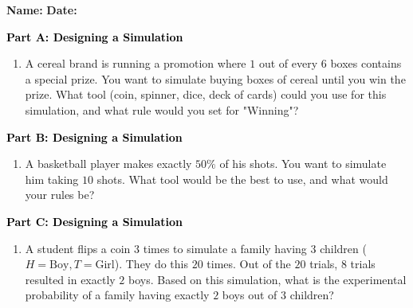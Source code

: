 \documentclass[12pt, letterpaper, fleqn]{article}
\begin{document}
\textbf{Name:} \underline{\hspace{5cm}}
\hfill
\textbf{Date:} \underline{\hspace{3cm}}\\

\begin{tcolorbox}[colback=customteal!20]
\large\textcolor{black}{\textbf{Part A: Designing a Simulation}}
\end{tcolorbox}

\vspace{3mm}

\begin{enumerate}[itemsep=4.2cm, leftmargin=0.6cm]
\item A cereal brand is running a promotion where $1$ out of every $6$ boxes contains a special prize. You want to simulate buying boxes of cereal until you win the prize. What tool (coin, spinner, dice, deck of cards) could you use for this simulation, and what rule would you set for "Winning"?
\end{enumerate}

\newpage

\begin{tcolorbox}[colback=customteal!20]
\large\textcolor{black}{\textbf{Part B: Designing a Simulation}}
\end{tcolorbox}

\vspace{3mm}

\begin{enumerate}[itemsep=4.2cm, leftmargin=0.6cm, resume]
\item A basketball player makes exactly $50\%$ of his shots. You want to simulate him taking $10$ shots. What tool would be the best to use, and what would your rules be?
\end{enumerate}

\newpage

\begin{tcolorbox}[colback=customteal!20]
\large\textcolor{black}{\textbf{Part C: Designing a Simulation}}
\end{tcolorbox}

\vspace{3mm}

\begin{enumerate}[itemsep=4.2cm, leftmargin=0.6cm, resume]
\item A student flips a coin $3$ times to simulate a family having $3$ children ($H = \text{Boy}, T = \text{Girl}$). They do this $20$ times. Out of the $20$ trials, $8$ trials resulted in exactly $2$ boys. Based on this simulation, what is the experimental probability of a family having exactly $2$ boys out of $3$ children?
\end{enumerate}
\end{document}
